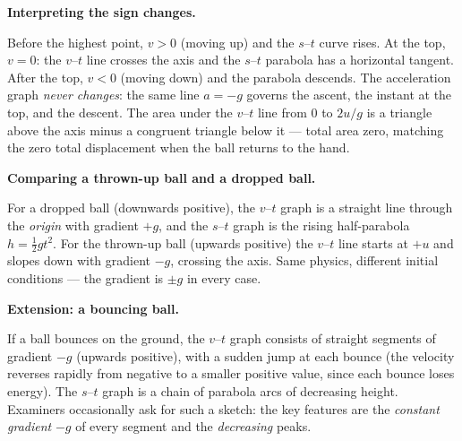 \documentclass[11pt]{article}
\begin{document}
\textbf{Interpreting the sign changes.}\par
Before the highest point, $v > 0$ (moving up) and the $s$--$t$ curve rises. At the top, $v = 0$: the $v$--$t$ line crosses the axis and the $s$--$t$ parabola has a horizontal tangent. After the top, $v < 0$ (moving down) and the parabola descends. The acceleration graph \emph{never changes}: the same line $a = -g$ governs the ascent, the instant at the top, and the descent. The area under the $v$--$t$ line from $0$ to $2u/g$ is a triangle above the axis minus a congruent triangle below it — total area zero, matching the zero total displacement when the ball returns to the hand.

\textbf{Comparing a thrown-up ball and a dropped ball.}\par
For a dropped ball (downwards positive), the $v$--$t$ graph is a straight line through the \emph{origin} with gradient $+g$, and the $s$--$t$ graph is the rising half-parabola $h = \tfrac12 gt^2$. For the thrown-up ball (upwards positive) the $v$--$t$ line starts at $+u$ and slopes down with gradient $-g$, crossing the axis. Same physics, different initial conditions — the gradient is $\pm g$ in every case.

\textbf{Extension: a bouncing ball.}\par
If a ball bounces on the ground, the $v$--$t$ graph consists of straight segments of gradient $-g$ (upwards positive), with a sudden jump at each bounce (the velocity reverses rapidly from negative to a smaller positive value, since each bounce loses energy). The $s$--$t$ graph is a chain of parabola arcs of decreasing height. Examiners occasionally ask for such a sketch: the key features are the \emph{constant gradient} $-g$ of every segment and the \emph{decreasing} peaks.
\end{document}
